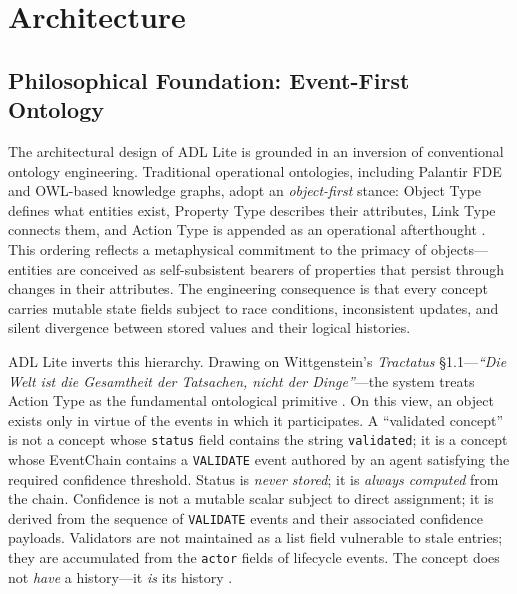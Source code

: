 \section{Architecture}\label{architecture}

\subsection{Philosophical Foundation: Event-First Ontology}\label{philosophical-foundation-event-first-ontology}

The architectural design of ADL Lite is grounded in an inversion of conventional ontology engineering. Traditional operational ontologies, including Palantir FDE and OWL-based knowledge graphs, adopt an \emph{object-first} stance: Object Type defines what entities exist, Property Type describes their attributes, Link Type connects them, and Action Type is appended as an operational afterthought \cite{ref6}\cite{ref14}. This ordering reflects a metaphysical commitment to the primacy of objects---entities are conceived as self-subsistent bearers of properties that persist through changes in their attributes. The engineering consequence is that every concept carries mutable state fields subject to race conditions, inconsistent updates, and silent divergence between stored values and their logical histories.

ADL Lite inverts this hierarchy. Drawing on Wittgenstein's \emph{Tractatus} §1.1---\emph{``Die Welt ist die Gesamtheit der Tatsachen, nicht der Dinge''}---the system treats Action Type as the fundamental ontological primitive \cite{ref9}\cite{ref10}. On this view, an object exists only in virtue of the events in which it participates. A ``validated concept'' is not a concept whose \texttt{status} field contains the string \texttt{validated}; it is a concept whose EventChain contains a \texttt{VALIDATE} event authored by an agent satisfying the required confidence threshold. Status is \emph{never stored}; it is \emph{always computed} from the chain. Confidence is not a mutable scalar subject to direct assignment; it is derived from the sequence of \texttt{VALIDATE} events and their associated confidence payloads. Validators are not maintained as a list field vulnerable to stale entries; they are accumulated from the \texttt{actor} fields of lifecycle events. The concept does not \emph{have} a history---it \emph{is} its history \cite{ref11}\cite{ref15}.

